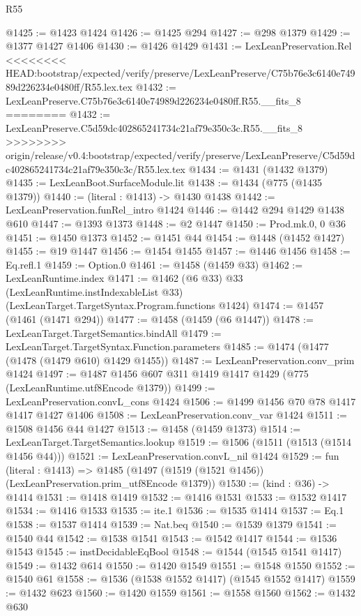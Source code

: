 \begin{lexlean}{R55}
\begin{coremodule}
{{{{{{{{{{{{{{{{{{{{{{{{{{{{{{{{{{{{{{{{{{{{{{{{{{{{{{{{{{{{{{@1425 := @1423 @1424
@1426 := @1425 @294
@1427 := @298 @1379
@1429 := @1377 @1427 @1406
@1430 := @1426 @1429
@1431 := LexLeanPreservation.Rel
<<<<<<<< HEAD:bootstrap/expected/verify/preserve/LexLeanPreserve/C75b76e3c6140e74989d226234e0480ff/R55.lex.tex
@1432 := LexLeanPreserve.C75b76e3c6140e74989d226234e0480ff.R55.__fits_8
========
@1432 := LexLeanPreserve.C5d59dc402865241734c21af79e350c3c.R55.__fits_8
>>>>>>>> origin/release/v0.4:bootstrap/expected/verify/preserve/LexLeanPreserve/C5d59dc402865241734c21af79e350c3c/R55.lex.tex
@1434 := @1431 (@1432 @1379)
@1435 := LexLeanBoot.SurfaceModule.lit
@1438 := @1434 (@775 (@1435 @1379))
@1440 := (literal : @1413) -> @1430 @1438
@1442 := LexLeanPreservation.funRel_intro @1424
@1446 := @1442 @294 @1429 @1438 @610
@1447 := @1393 @1373
@1448 := @2 @1447
@1450 := Prod.mk.{0, 0} @36
@1451 := @1450 @1373
@1452 := @1451 @44
@1454 := @1448 (@1452 @1427)
@1455 := @19 @1447
@1456 := @1454 @1455
@1457 := @1446 @1456
@1458 := Eq.refl.{1}
@1459 := Option.{0}
@1461 := @1458 (@1459 @33)
@1462 := LexLeanRuntime.index
@1471 := @1462
    (@6 @33)
    @33
    (LexLeanRuntime.instIndexableList @33)
    (LexLeanTarget.TargetSyntax.Program.functions @1424)
@1474 := @1457 (@1461 (@1471 @294))
@1477 := @1458 (@1459 (@6 @1447))
@1478 := LexLeanTarget.TargetSemantics.bindAll
@1479 := LexLeanTarget.TargetSyntax.Function.parameters
@1485 := @1474 (@1477 (@1478 (@1479 @610) @1429 @1455))
@1487 := LexLeanPreservation.conv_prim @1424
@1497 := @1487 @1456 @607 @311 @1419 @1417 @1429 (@775 (LexLeanRuntime.utf8Encode @1379))
@1499 := LexLeanPreservation.convL_cons @1424
@1506 := @1499 @1456 @70 @78 @1417 @1417 @1427 @1406
@1508 := LexLeanPreservation.conv_var @1424
@1511 := @1508 @1456 @44 @1427
@1513 := @1458 (@1459 @1373)
@1514 := LexLeanTarget.TargetSemantics.lookup
@1519 := @1506 (@1511 (@1513 (@1514 @1456 @44)))
@1521 := LexLeanPreservation.convL_nil @1424
@1529 := fun (literal : @1413) =>
  @1485 (@1497 (@1519 (@1521 @1456)) (LexLeanPreservation.prim_utf8Encode @1379))
@1530 := (kind : @36) -> @1414
@1531 := @1418 @1419
@1532 := @1416 @1531
@1533 := @1532 @1417
@1534 := @1416 @1533
@1535 := ite.{1}
@1536 := @1535 @1414
@1537 := Eq.{1}
@1538 := @1537 @1414
@1539 := Nat.beq
@1540 := @1539 @1379
@1541 := @1540 @44
@1542 := @1538 @1541
@1543 := @1542 @1417
@1544 := @1536 @1543
@1545 := instDecidableEqBool
@1548 := @1544 (@1545 @1541 @1417)
@1549 := @1432 @614
@1550 := @1420 @1549
@1551 := @1548 @1550
@1552 := @1540 @61
@1558 := @1536 (@1538 @1552 @1417) (@1545 @1552 @1417)
@1559 := @1432 @623
@1560 := @1420 @1559
@1561 := @1558 @1560
@1562 := @1432 @630
}}}}}}}}}}}}}}}}}}}}}}}}}}}}}}}}}}}}}}}}}}}}}}}}}}}}}}}}}}}}}}
\end{coremodule}
\end{lexlean}
